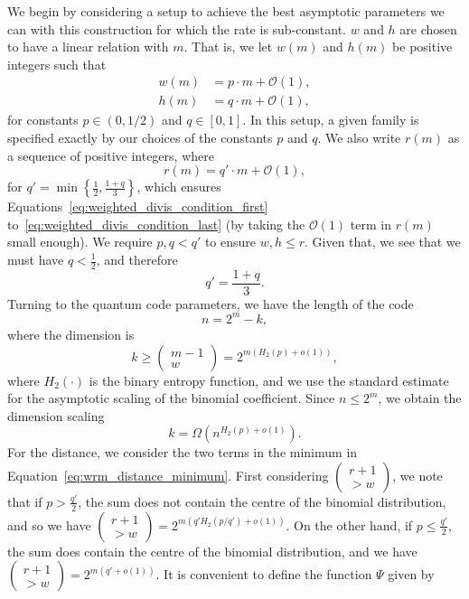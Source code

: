 \documentclass{article}
\begin{document}
We begin by considering a setup to achieve the best asymptotic parameters we can with this construction for which the rate is sub-constant. $w$ and $h$ are chosen to have a linear relation with $m$. That is, we let $w(m)$ and $h(m)$ be positive integers such that
\begin{align}
    w(m) &= p\cdot m + \mathcal{O}(1),\\
    h(m) &= q\cdot m + \mathcal{O}(1),
\end{align}
for constants $p \in (0,1/2)$ and $q \in [0,1]$. In this setup, a given family is specified exactly by our choices of the constants $p$ and $q$. We also write $r(m)$ as a sequence of positive integers, where
\begin{equation}
    r(m) = q'\cdot m + \mathcal{O}(1),
\end{equation}
for $q'= \min\left\{\frac{1}{2}, \frac{1+q}{3}\right\}$, which ensures Equations~\eqref{eq:weighted_divis_condition_first} to~\eqref{eq:weighted_divis_condition_last} (by taking the $\mathcal{O}(1)$ term in $r(m)$ small enough). We require $p,q < q'$ to ensure $w,h \leq r$. Given that, we see that we must have $q < \frac{1}{2}$, and therefore
\begin{equation}
    q' = \frac{1+q}{3}.
\end{equation}
Turning to the quantum code parameters, we have the length of the code
\begin{equation}
    n = 2^m - k,
\end{equation}
where the dimension is
\begin{equation}
    k \geq \begin{pmatrix}
        m-1\\w
    \end{pmatrix} = 2^{m(H_2(p) + o(1))},
\end{equation}
where $H_2(\cdot)$ is the binary entropy function, and we use the standard estimate for the asymptotic scaling of the binomial coefficient. Since $n \leq 2^m$, we obtain the dimension scaling
\begin{equation}
    k = \Omega\left(n^{H_2(p) + o(1)}\right).
\end{equation}
For the distance, we consider the two terms in the minimum in Equation~\eqref{eq:wrm_distance_minimum}. First considering $\left(\begin{smallmatrix}r+1\\>w\end{smallmatrix}\right)$, we note that if $p > \frac{q'}{2}$, the sum does not contain the centre of the binomial distribution, and so we have $\left(\begin{smallmatrix}r+1\\>w\end{smallmatrix}\right) = 2^{m\left(q'H_2(p/q')+o(1)\right)}$. On the other hand, if $p \leq \frac{q'}{2}$, the sum does contain the centre of the binomial distribution, and we have $\left(\begin{smallmatrix}r+1\\>w\end{smallmatrix}\right) = 2^{m\left(q'+o(1)\right)}$. It is convenient to define the function $\Psi$ given by
\end{document}
